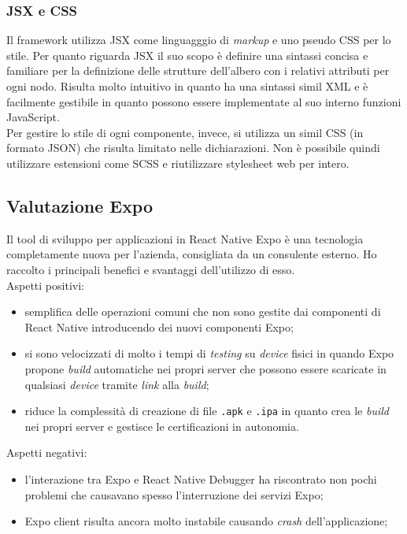\subsubsection{JSX e CSS}
Il framework utilizza JSX come linguagggio di \emph{markup} e uno pseudo CSS per lo stile.
Per quanto riguarda JSX il suo scopo è definire una sintassi concisa e familiare per la definizione delle strutture dell'albero con i relativi attributi per ogni nodo. Risulta molto intuitivo in quanto ha una sintassi simil XML e è facilmente gestibile in quanto possono essere implementate al suo interno funzioni JavaScript.\\
Per gestire lo stile di ogni componente, invece,  si utilizza un simil CSS (in formato JSON) che risulta limitato nelle dichiarazioni. Non è possibile quindi utilizzare estensioni come SCSS e riutilizzare stylesheet web per intero. 

\subsection{Valutazione Expo}
Il tool di sviluppo per applicazioni in React Native Expo è una tecnologia completamente nuova per l'azienda, consigliata da un consulente esterno. Ho raccolto i principali benefici e svantaggi dell'utilizzo di esso.\\
Aspetti positivi:
\begin{itemize}
	\item semplifica delle operazioni comuni che non sono gestite dai componenti di React Native introducendo dei nuovi componenti Expo;
	\item si sono velocizzati di molto i tempi di \emph{testing} su \emph{device} fisici in quando Expo propone \emph{build} automatiche nei propri server che possono essere scaricate in qualsiasi \emph{device} tramite \emph{link} alla \emph{build};
	\item riduce la complessità di creazione di file \texttt{.apk} e \texttt{.ipa} in quanto crea le \emph{build} nei propri server e gestisce le certificazioni in autonomia.
\end{itemize}
Aspetti negativi:
\begin{itemize}
	\item l'interazione tra Expo e React Native Debugger ha riscontrato non pochi problemi che causavano spesso l'interruzione dei servizi Expo;
	\item Expo client risulta ancora molto instabile causando \emph{crash} dell'applicazione;
\end{itemize}
\newpage
